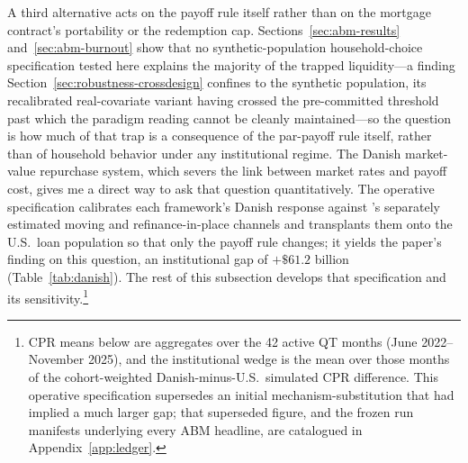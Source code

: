 \documentclass[12pt]{article}
\begin{document}
A third alternative acts on the payoff rule itself rather than on the mortgage contract's portability or the redemption cap. Sections~\ref{sec:abm-results} and~\ref{sec:abm-burnout} show that no synthetic-population household-choice specification tested here explains the majority of the trapped liquidity---a finding Section~\ref{sec:robustness-crossdesign} confines to the synthetic population, its recalibrated real-covariate variant having crossed the pre-committed threshold past which the paradigm reading cannot be cleanly maintained---so the question is how much of that trap is a consequence of the par-payoff rule itself, rather than of household behavior under any institutional regime. The Danish market-value repurchase system, which severs the link between market rates and payoff cost, gives me a direct way to ask that question quantitatively. The operative specification calibrates each framework's Danish response against \citet{berger2026}'s separately estimated moving and refinance-in-place channels and transplants them onto the U.S.\ loan population so that only the payoff rule changes; it yields the paper's finding on this question, an institutional gap of $+\$61.2$ billion (Table~\ref{tab:danish}). The rest of this subsection develops that specification and its sensitivity.\footnote{\label{fn:manifest}CPR means below are aggregates over the 42 active QT months (June 2022--November 2025), and the institutional wedge is the mean over those months of the cohort-weighted Danish-minus-U.S.\ simulated CPR difference. This operative specification supersedes an initial mechanism-substitution that had implied a much larger gap; that superseded figure, and the frozen run manifests underlying every ABM headline, are catalogued in Appendix~\ref{app:ledger}.}
\end{document}
